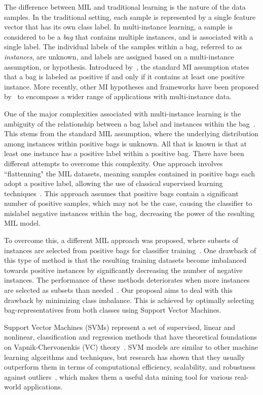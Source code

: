 The difference between MIL and traditional learning is the nature of the data samples. In the traditional setting, each sample is represented by a single feature vector that has its own class label. In multi-instance learning, a sample is considered to be a \textit{bag} that contains multiple instances, and is associated with a single label. The individual labels of the samples within a bag, referred to as \textit{instances}, are unknown, and labels are assigned based on a multi-instance assumption, or hypothesis. Introduced by~\cite{Dietterich1997}, the standard MI assumption states that a bag is labeled as positive if and only if it contains at least one positive instance. More recently, other MI hypotheses and frameworks have been proposed by~\cite{Foulds2010} to encompass a wider range of applications with multi-instance data. 

One of the major complexities associated with multi-instance learning is the ambiguity of the relationship between a bag label and instances within the bag~\citep{Alpaydin2015}. This stems from the standard MIL assumption, where the underlying distribution among instances within positive bags is unknown. All that is known is that at least one instance has a positive label within a positive bag. There have been different attempts to overcome this complexity. One approach involves ``flattenning" the MIL datasets, meaning samples contained in positive bags each adopt a positive label, allowing the use of classical supervised learning techniques~\citep{Ray2005}. This approach assumes that positive bags contain a significant number of positive samples, which may not be the case, causing the classifier to mislabel negative instances within the bag, decreasing the power of the resulting MIL model. 

To overcome this, a different MIL approach was proposed, where subsets of instances are selected from positive bags for classifier training~\citep{Maron1998,Zhang2001}. One drawback of this type of method is that the resulting training datasets become imbalanced towards positive instances by significantly decreasing the number of negative instances. The performance of these methods deteriorates when more instances are selected as subsets than needed~\citep{Carbonneau2016,Faria2017196,Vanwinckelen2016}. Our proposal aims to deal with this drawback by minimizing class imbalance. This is achieved by optimally selecting bag-representatives from both classes using Support Vector Machines.

Support Vector Machines (SVMs) represent a set of supervised, linear and nonlinear, classification and regression methods that have theoretical foundations on Vapnik-Chervonenkis (VC) theory~\citep{Huang2006,Schoelkopf2002}. SVM models are similar to other machine learning algorithms and techniques, but research has shown that they usually outperform them in terms of computational efficiency, scalability, and robustness against outliers~\citep{Kecman2016,Melki2016}, which makes them a useful data mining tool for various real-world applications. 

